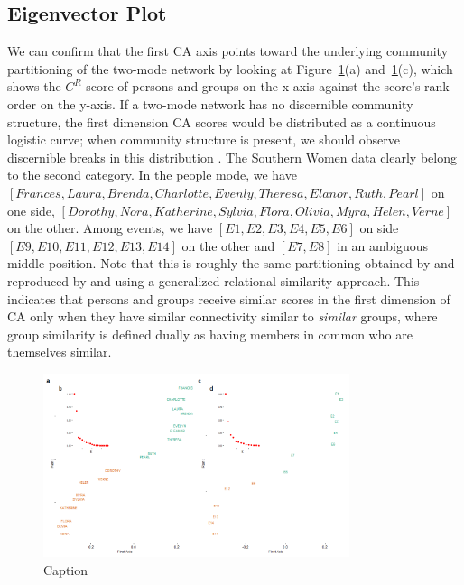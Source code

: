 \documentclass[a4paper,fleqn]{cas-sc}
\begin{document}
\subsection{Eigenvector Plot}
We can confirm that the first CA axis points toward the underlying community partitioning of the two-mode network by looking at Figure~\ref{fig:ca-eigvec}(a) and~\ref{fig:ca-eigvec}(c), which shows the $C^R$ score of persons and groups on the x-axis against the score's rank order on the y-axis. If a two-mode network has no discernible community structure, the first dimension CA scores would be distributed as a continuous logistic curve; when community structure is present, we should observe discernible breaks in this distribution \citep{van2021correspondence}. The Southern Women data clearly belong to the second category. In the people mode, we have $\left[Frances, Laura, Brenda, Charlotte, Evenly, Theresa, Elanor, Ruth, Pearl\right]$ on one side, $\left[Dorothy, Nora, Katherine, Sylvia, Flora, Olivia, Myra, Helen, Verne\right]$ on the other. Among events, we have $\left[E1, E2, E3, E4, E5, E6\right]$ on side $\left[E9, E10, E11, E12, E13, E14\right]$ on the other and $\left[E7, E8\right]$ in an ambiguous middle position. Note that this is roughly the same partitioning obtained by \citep{doreian2004generalized} and reproduced by \citet{kovacs2010generalized} and \citet{lizardo2024two} using a generalized relational similarity approach. This indicates that persons and groups receive similar scores in the first dimension of CA only when they have similar connectivity similar to \textit{similar} groups, where group similarity is defined dually as having members in common who are themselves similar. 

\begin{figure}
    \centering
    \includegraphics[width=0.8\textwidth]{Plots/ca-eigvec.png}
    \caption{Caption}
    \label{fig:ca-eigvec}
\end{figure}
\end{document}
